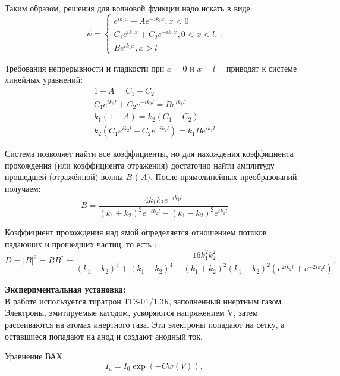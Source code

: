 \documentclass[a4paper, 12pt]{article}%
\begin{document}
	Таким образом, решения для волновой функции надо искать в виде:
	$$
	\psi=\left\{\begin{array}{c}
		e^{i k_1 x}+A e^{-i k_1 x}, x<0 \\
		C_1 e^{i k_1 x}+C_2 e^{-i k_1 x}, 0<x<l . \\
		B e^{i k_1 x}, x>l
	\end{array} .\right.
	$$
	
	Требования непрерывности и гладкости при $x=0$ и $x=l \quad$ приводят к системе линейных уравнений:
	$$
	\begin{gathered}
		1+A=C_1+C_2 \\
		C_1 e^{i k_2 l}+C_2 e^{-i k_2 l}=B e^{i k_1 l} \\
		k_1(1-A)=k_2\left(C_1-C_2\right) \\
		k_2\left(C_1 e^{i k_2 l}-C_2 e^{-i k_2 l}\right)=k_1 B e^{i k_1 l}
	\end{gathered}
	$$
	
	Система позволяет найти все коэффициенты, но для нахождения коэффициента прохождения (или коэффициента отражения) достаточно найти амплитуду прошедшей (отражённой) волны $B$ ( $A)$. После прямолинейных преобразований получаем:
	$$
	B=\frac{4 k_1 k_2 e^{-i k_1 l}}{\left(k_1+k_2\right)^2 e^{-i k_2 l}-\left(k_1-k_2\right)^2 e^{i k_1 l}}
	$$
	
	Коэффициент прохождения над ямой определяется отношением потоков падающих и прошедших частиц, то есть :
	$$
	D=|B|^2=B B^*=\frac{16 k_1^2 k_2^2}{\left(k_1+k_2\right)^4+\left(k_1-k_2\right)^4-\left(k_1+k_2\right)^2\left(k_1-k_2\right)^2\left(e^{2 i k_2 l}+e^{-2 i k_2 l}\right)} .
	$$
	
	\textbf{Экспериментальная установка: }\\
	
	В работе используется тиратрон ТГЗ-01/1.3Б, заполненный инертным газом. Электроны, эмитируемые катодом, ускоряются напряжением V, затем рассеиваются на атомах инертного газа. Эти электроны попадают на сетку, а оставшиеся попадают на анод и создают анодный ток.
	
	Уравнение ВАХ 
	\begin{equation}\label{3}
		I_\text{a} = I_0 \exp\left( - C w(V) \right),
	\end{equation}
\end{document}
